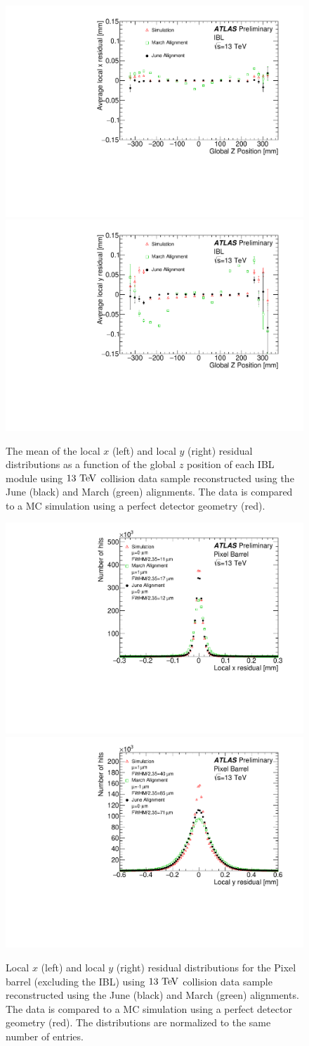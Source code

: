 \begin{figure}[htbp]
  \centering
  \includegraphics[width=.48\textwidth]{figs/alignment/align2015/IBL_xRESvsZ}
  \includegraphics[width=.48\textwidth]{figs/alignment/align2015/IBL_yRESvsZ}
  \caption{The mean of the local $x$ (left) and local $y$ (right) residual distributions as a function of the global $z$ position of each IBL module using $13\tev$ collision data sample reconstructed using the June (black) and March (green) alignments.  The data is compared to a MC simulation using a perfect detector geometry (red).}
  \label{fig:align_2015_results_ibl_z}
\end{figure}

\begin{figure}[htbp]
  \centering
  \includegraphics[width=.48\textwidth]{figs/alignment/align2015/OLDPIXX}
  \includegraphics[width=.48\textwidth]{figs/alignment/align2015/OLDPIXY}
  \caption{Local $x$ (left) and local $y$ (right) residual distributions for the Pixel barrel (excluding the IBL) using $13\tev$ collision data sample reconstructed using the June (black) and March (green) alignments.  The data is compared to a MC simulation using a perfect detector geometry (red).  The distributions are normalized to the same number of entries.}
  \label{fig:align_2015_results_pix}
\end{figure}

